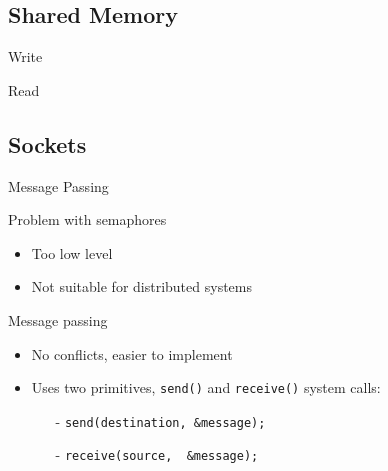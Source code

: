 
\subsection{Shared Memory}
\label{sec:shared-memory}

\begin{frame}{Write}
\begin{center}
\end{center}
\end{frame}

\begin{frame}{Read}
\begin{center}
\end{center}
\end{frame}

\subsection{Sockets}
\label{sec:sockets}

\begin{frame}{Message Passing}
  \begin{block}{Problem with semaphores}
    \begin{itemize}
    \item Too low level
    \item Not suitable for distributed systems
    \end{itemize}
  \end{block}
  \begin{block}{Message passing}
    \begin{itemize}
    \item No conflicts, easier to implement
    \item Uses two primitives, \texttt{send()} and \texttt{receive()} system calls:
      \begin{itemize}
      \item[-] \texttt{send(destination,\ \&message);}
      \item[-] \texttt{receive(source, \ \&message);}
      \end{itemize}
    \end{itemize}
  \end{block}
\end{frame}

